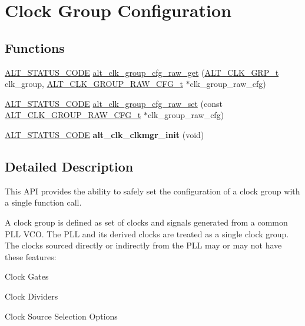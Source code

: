 \hypertarget{group__CLK__MGR__GROUP__CFG}{}\section{Clock Group Configuration}
\label{group__CLK__MGR__GROUP__CFG}
\subsection*{Functions}
\begin{DoxyCompactItemize}
\item 
\mbox{\hyperlink{hwlib_8h_abdb0d369f069723ca55d6c94bcaaaa12}{A\+L\+T\+\_\+\+S\+T\+A\+T\+U\+S\+\_\+\+C\+O\+DE}} \mbox{\hyperlink{group__CLK__MGR__GROUP__CFG_ga8bcf8cd04e2eddface10a7a0dd6f7b3d}{alt\+\_\+clk\+\_\+group\+\_\+cfg\+\_\+raw\+\_\+get}} (\mbox{\hyperlink{alt__clock__group_8h_a077fbf1185c79377d6bdfe47a56713eb}{A\+L\+T\+\_\+\+C\+L\+K\+\_\+\+G\+R\+P\+\_\+t}} clk\+\_\+group, \mbox{\hyperlink{alt__clock__group_8h_aa160da43d5fe69a1f50985e94e199b54}{A\+L\+T\+\_\+\+C\+L\+K\+\_\+\+G\+R\+O\+U\+P\+\_\+\+R\+A\+W\+\_\+\+C\+F\+G\+\_\+t}} $\ast$clk\+\_\+group\+\_\+raw\+\_\+cfg)
\item 
\mbox{\hyperlink{hwlib_8h_abdb0d369f069723ca55d6c94bcaaaa12}{A\+L\+T\+\_\+\+S\+T\+A\+T\+U\+S\+\_\+\+C\+O\+DE}} \mbox{\hyperlink{group__CLK__MGR__GROUP__CFG_ga760bdf4144b1cab6a00c712268c29ef0}{alt\+\_\+clk\+\_\+group\+\_\+cfg\+\_\+raw\+\_\+set}} (const \mbox{\hyperlink{alt__clock__group_8h_aa160da43d5fe69a1f50985e94e199b54}{A\+L\+T\+\_\+\+C\+L\+K\+\_\+\+G\+R\+O\+U\+P\+\_\+\+R\+A\+W\+\_\+\+C\+F\+G\+\_\+t}} $\ast$clk\+\_\+group\+\_\+raw\+\_\+cfg)
\item 
\mbox{\label{group__CLK__MGR__GROUP__CFG_gac806e0422970f5ffa6d80a75443fc7fb}} 
\mbox{\hyperlink{hwlib_8h_abdb0d369f069723ca55d6c94bcaaaa12}{A\+L\+T\+\_\+\+S\+T\+A\+T\+U\+S\+\_\+\+C\+O\+DE}} {\bfseries alt\+\_\+clk\+\_\+clkmgr\+\_\+init} (void)
\end{DoxyCompactItemize}


\subsection{Detailed Description}
This A\+PI provides the ability to safely set the configuration of a clock group with a single function call.

A clock group is defined as set of clocks and signals generated from a common P\+LL V\+CO. The P\+LL and its derived clocks are treated as a single clock group. The clocks sourced directly or indirectly from the P\+LL may or may not have these features\+:
\begin{DoxyItemize}
\item Clock Gates
\item Clock Dividers
\item Clock Source Selection Options
\end{DoxyItemize}

